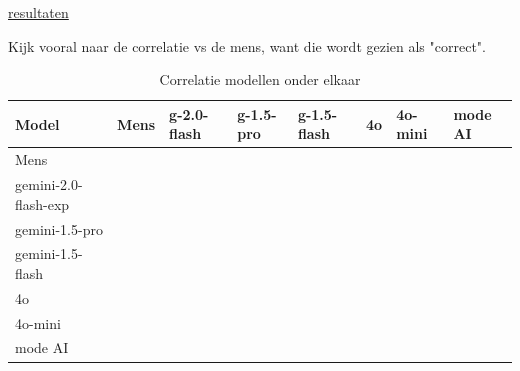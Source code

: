 \documentclass[12pt]{article}
\begin{document}
\href{https://docs.google.com/spreadsheets/d/10NNihuDYj4w9L_6Zt7fzNZCPK-7qFkCTgRn8BRHSbsM}{resultaten}

\noindent\begin{table}[H]
\caption{Correlatie modellen onder elkaar}
\label{fig:correlatie-model}
Kijk vooral naar de correlatie vs de mens, want die wordt gezien als "correct".
\begin{tabularx}{\textwidth}{p{4cm} XXXXXXX}
    \toprule
    \textbf{Model} & \textbf{Mens} & \textbf{g-2.0-flash} & \textbf{g-1.5-pro} & \textbf{g-1.5-flash} & \textbf{4o} & \textbf{4o-mini} & \textbf{mode AI} \\
    \midrule
    Mens & \cellcolor[rgb]{0.275,0.514,0.275}{1.0000} \\
    gemini-2.0-flash-exp & \cellcolor[rgb]{0.560,0.705,0.560}{0.9616} & \cellcolor[rgb]{0.275,0.514,0.275}{1.0000} \\
    gemini-1.5-pro & \cellcolor[rgb]{0.978,0.986,0.978}{0.9054} & \cellcolor[rgb]{0.802,0.867,0.802}{0.9291} & \cellcolor[rgb]{0.275,0.514,0.275}{1.0000} \\
    gemini-1.5-flash & \cellcolor[rgb]{0.951,0.967,0.951}{0.9090} & \cellcolor[rgb]{1.000,1.000,1.000}{0.9025} & \cellcolor[rgb]{0.648,0.764,0.648}{0.9497} & \cellcolor[rgb]{0.275,0.514,0.275}{1.0000} \\
    4o & \cellcolor[rgb]{0.640,0.759,0.640}{0.9509} & \cellcolor[rgb]{0.596,0.729,0.596}{0.9568} & \cellcolor[rgb]{0.716,0.810,0.716}{0.9406} & \cellcolor[rgb]{0.658,0.770,0.658}{0.9485} & \cellcolor[rgb]{0.275,0.514,0.275}{1.0000} \\
    4o-mini & \cellcolor[rgb]{0.914,0.942,0.914}{0.9141} & \cellcolor[rgb]{0.804,0.868,0.804}{0.9289} & \cellcolor[rgb]{0.914,0.943,0.914}{0.9140} & \cellcolor[rgb]{0.846,0.897,0.846}{0.9232} & \cellcolor[rgb]{0.726,0.816,0.726}{0.9394} & \cellcolor[rgb]{0.275,0.514,0.275}{1.0000} \\
    mode AI & \cellcolor[rgb]{0.614,0.741,0.614}{0.9544} & \cellcolor[rgb]{0.512,0.673,0.512}{0.9680} & \cellcolor[rgb]{0.550,0.698,0.550}{0.9630} & \cellcolor[rgb]{0.633,0.754,0.633}{0.9518} & \cellcolor[rgb]{0.357,0.569,0.357}{0.9889} & \cellcolor[rgb]{0.673,0.781,0.673}{0.9464} & \cellcolor[rgb]{0.275,0.514,0.275}{1.0000} \\
    \bottomrule
\end{tabularx}
\end{table}
\end{document}
